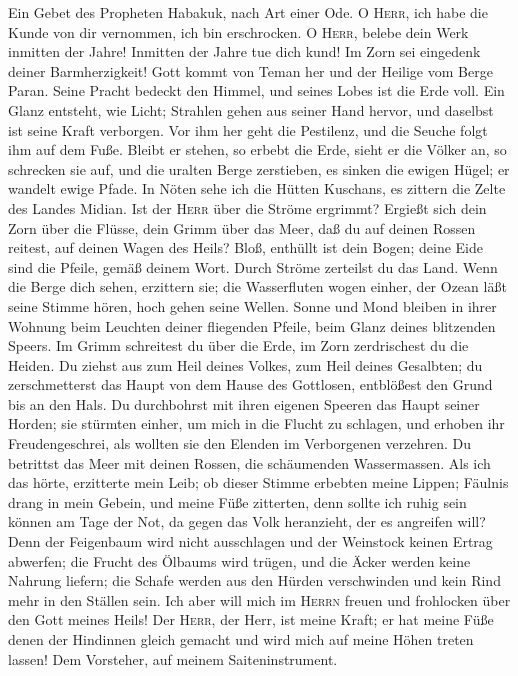  Ein Gebet des Propheten Habakuk, nach Art einer Ode.
 O \textsc{Herr}, ich habe die Kunde von dir vernommen,
ich bin erschrocken. O \textsc{Herr}, belebe dein Werk inmitten der
Jahre! Inmitten der Jahre tue dich kund! Im Zorn sei eingedenk deiner
Barmherzigkeit!  Gott kommt von Teman her und der Heilige
vom Berge Paran. Seine Pracht bedeckt den Himmel, und seines Lobes ist
die Erde voll.  Ein Glanz entsteht, wie Licht; Strahlen
gehen aus seiner Hand hervor, und daselbst ist seine Kraft verborgen.
 Vor ihm her geht die Pestilenz, und die Seuche folgt ihm
auf dem Fuße.  Bleibt er stehen, so erbebt die Erde, sieht
er die Völker an, so schrecken sie auf, und die uralten Berge
zerstieben, es sinken die ewigen Hügel; er wandelt ewige Pfade.
 In Nöten sehe ich die Hütten Kuschans, es zittern die
Zelte des Landes Midian.  Ist der \textsc{Herr} über die
Ströme ergrimmt? Ergießt sich dein Zorn über die Flüsse, dein Grimm über
das Meer, daß du auf deinen Rossen reitest, auf deinen Wagen des Heils?
 Bloß, enthüllt ist dein Bogen; deine Eide sind die
Pfeile, gemäß deinem Wort. Durch Ströme zerteilst du das Land.
 Wenn die Berge dich sehen, erzittern sie; die
Wasserfluten wogen einher, der Ozean läßt seine Stimme hören, hoch gehen
seine Wellen.  Sonne und Mond bleiben in ihrer Wohnung
beim Leuchten deiner fliegenden Pfeile, beim Glanz deines blitzenden
Speers.  Im Grimm schreitest du über die Erde, im Zorn
zerdrischest du die Heiden.  Du ziehst aus zum Heil
deines Volkes, zum Heil deines Gesalbten; du zerschmetterst das Haupt
von dem Hause des Gottlosen, entblößest den Grund bis an den Hals.
 Du durchbohrst mit ihren eigenen Speeren das Haupt
seiner Horden; sie stürmten einher, um mich in die Flucht zu schlagen,
und erhoben ihr Freudengeschrei, als wollten sie den Elenden im
Verborgenen verzehren.  Du betrittst das Meer mit deinen
Rossen, die schäumenden Wassermassen.  Als ich das hörte,
erzitterte mein Leib; ob dieser Stimme erbebten meine Lippen; Fäulnis
drang in mein Gebein, und meine Füße zitterten, denn sollte ich ruhig
sein können am Tage der Not, da gegen das Volk heranzieht, der es
angreifen will?  Denn der Feigenbaum wird nicht
ausschlagen und der Weinstock keinen Ertrag abwerfen; die Frucht des
Ölbaums wird trügen, und die Äcker werden keine Nahrung liefern; die
Schafe werden aus den Hürden verschwinden und kein Rind mehr in den
Ställen sein.  Ich aber will mich im \textsc{Herrn}
freuen und frohlocken über den Gott meines Heils!  Der
\textsc{Herr}, der Herr, ist meine Kraft; er hat meine Füße denen der
Hindinnen gleich gemacht und wird mich auf meine Höhen treten lassen!
Dem Vorsteher, auf meinem Saiteninstrument.
